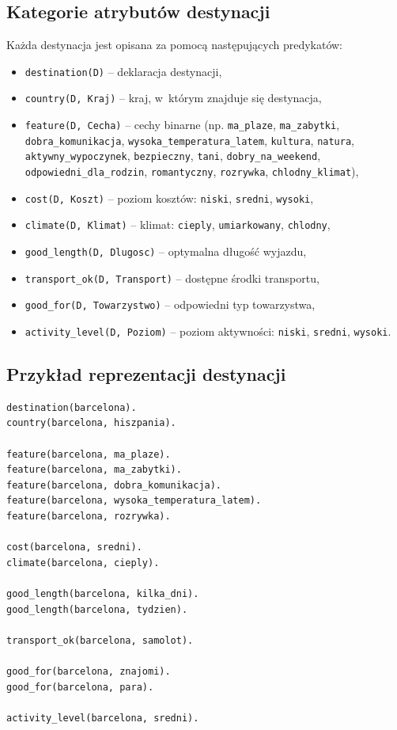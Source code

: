 \documentclass[12pt,a4paper]{article}
\begin{document}
\subsection{Kategorie atrybutów destynacji}

Każda destynacja jest opisana za pomocą następujących predykatów:

\begin{itemize}
    \item \texttt{destination(D)} -- deklaracja destynacji,
    \item \texttt{country(D, Kraj)} -- kraj, w~którym znajduje się destynacja,
    \item \texttt{feature(D, Cecha)} -- cechy binarne (np. \texttt{ma\_plaze}, \texttt{ma\_zabytki}, \texttt{dobra\_komunikacja}, \texttt{wysoka\_temperatura\_latem}, \texttt{kultura}, \texttt{natura}, \texttt{aktywny\_wypoczynek}, \texttt{bezpieczny}, \texttt{tani}, \texttt{dobry\_na\_weekend}, \texttt{odpowiedni\_dla\_rodzin}, \texttt{romantyczny}, \texttt{rozrywka}, \texttt{chlodny\_klimat}),
    \item \texttt{cost(D, Koszt)} -- poziom kosztów: \texttt{niski}, \texttt{sredni}, \texttt{wysoki},
    \item \texttt{climate(D, Klimat)} -- klimat: \texttt{cieply}, \texttt{umiarkowany}, \texttt{chlodny},
    \item \texttt{good\_length(D, Dlugosc)} -- optymalna długość wyjazdu,
    \item \texttt{transport\_ok(D, Transport)} -- dostępne środki transportu,
    \item \texttt{good\_for(D, Towarzystwo)} -- odpowiedni typ towarzystwa,
    \item \texttt{activity\_level(D, Poziom)} -- poziom aktywności: \texttt{niski}, \texttt{sredni}, \texttt{wysoki}.
\end{itemize}

\subsection{Przykład reprezentacji destynacji}

\begin{lstlisting}[style=prolog, caption={Reprezentacja Barcelony w~bazie wiedzy}]
destination(barcelona).
country(barcelona, hiszpania).

feature(barcelona, ma_plaze).
feature(barcelona, ma_zabytki).
feature(barcelona, dobra_komunikacja).
feature(barcelona, wysoka_temperatura_latem).
feature(barcelona, rozrywka).

cost(barcelona, sredni).
climate(barcelona, cieply).

good_length(barcelona, kilka_dni).
good_length(barcelona, tydzien).

transport_ok(barcelona, samolot).

good_for(barcelona, znajomi).
good_for(barcelona, para).

activity_level(barcelona, sredni).
\end{lstlisting}
\end{document}
